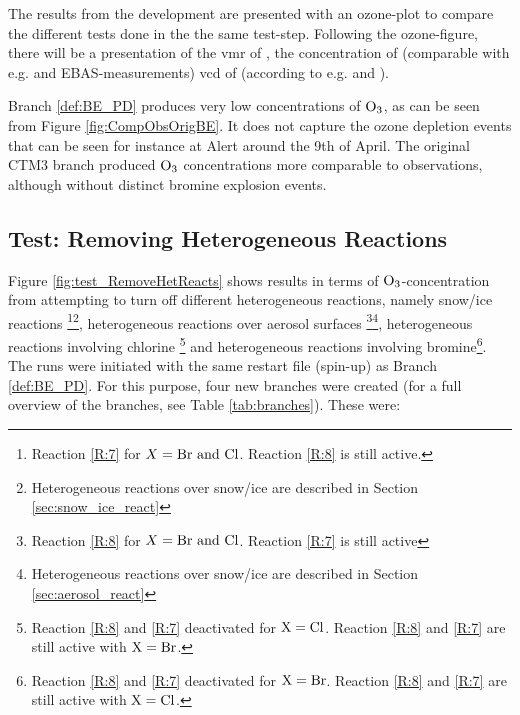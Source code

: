 \medskip

The results from the development are presented with an ozone-plot to compare the different tests done in the the same test-step. Following the ozone-figure, there will be a presentation of the \acrfull{vmr} of , the concentration of  (comparable with e.g. \cite{barrie} and EBAS-measurements) \acrfull{vcd} of  (according to e.g. \cite{Peterson2015} and \cite{Simpson2017}).

\medskip

Branch \ref{def:BE_PD} produces very low concentrations of $\mathrm{O_3}$, as can be seen from Figure \ref{fig:CompObsOrigBE}. It does not capture the ozone depletion events that can be seen for instance at Alert around the 9th of April. The original CTM3 branch produced $\mathrm{O_3}$ concentrations more comparable to observations, although without distinct bromine explosion events. 





\subsection{Test: Removing Heterogeneous Reactions}\label{subsec:res_remove_het_reacts}

Figure \ref{fig:test_RemoveHetReacts} shows results in terms of $\mathrm{O_3}$-concentration from attempting to turn off different heterogeneous reactions, namely snow/ice reactions \footnote{Reaction \ref{R:7} for $X= \mathrm{Br} \text{ and } \mathrm{Cl}$. Reaction \ref{R:8} is still active.}\footnote{Heterogeneous reactions over snow/ice are described in Section \ref{sec:snow_ice_react}}, heterogeneous reactions over aerosol surfaces \footnote{Reaction \ref{R:8} for $X= \mathrm{Br} \text{ and } \mathrm{Cl}$. Reaction \ref{R:7} is still active}\footnote{Heterogeneous reactions over snow/ice are described in Section \ref{sec:aerosol_react}}, heterogeneous reactions involving chlorine \footnote{Reaction \ref{R:8} and \ref{R:7} deactivated for $\mathrm{X} = \mathrm{Cl}$. Reaction \ref{R:8} and \ref{R:7} are still active with $\mathrm{X} = \mathrm{Br}$.} and heterogeneous reactions involving bromine\footnote{Reaction \ref{R:8} and \ref{R:7} deactivated for $\mathrm{X} = \mathrm{Br}$. Reaction \ref{R:8} and \ref{R:7} are still active with $\mathrm{X} = \mathrm{Cl}$.}. The runs were initiated with the same restart file (spin-up) as Branch \ref{def:BE_PD}. For this purpose, four new branches were created (for a full overview of the branches, see Table \ref{tab:branches}). These were:

